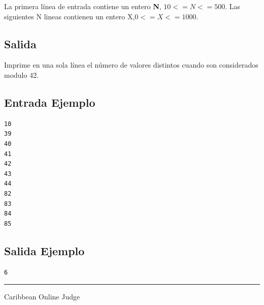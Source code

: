 \documentclass[letter,10pt]{article}
\newcommand{\lyxaddress}[1]{
\par {\raggedright #1
\vspace{1.4em}
\noindent\par}
}
\begin{document}
La primera línea de entrada contiene un entero \textbf{N}, $10<=N<=500$. Las siguientes N lineas contienen un entero X,$0<=X<=1000$.

\subsection*{Salida}

Imprime en una sola línea el número de valores distintos cuando son considerados modulo 42.

\subsection*{Entrada Ejemplo}
\begin{verbatim}
10
39
40
41
42
43
44
82
83
84
85
\end{verbatim}

\subsection*{Salida Ejemplo}

\begin{verbatim}
6
\end{verbatim}

\noindent \rule[0.5ex]{1\columnwidth}{1pt}


\lyxaddress{Caribbean Online Judge}
\end{document}
